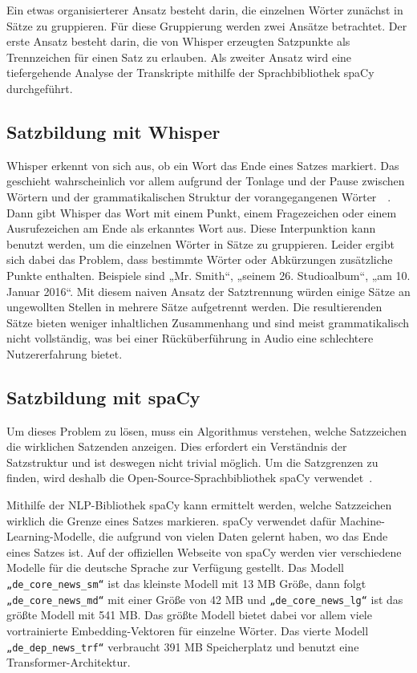 Ein etwas organisierterer Ansatz besteht darin, die einzelnen Wörter zunächst in Sätze zu gruppieren.
Für diese Gruppierung werden zwei Ansätze betrachtet.
Der erste Ansatz besteht darin, die von Whisper erzeugten Satzpunkte als Trennzeichen für einen Satz zu erlauben.
Als zweiter Ansatz wird eine tiefergehende Analyse der Transkripte mithilfe der Sprachbibliothek spaCy durchgeführt.

\subsection{Satzbildung mit Whisper}

Whisper erkennt von sich aus, ob ein Wort das Ende eines Satzes markiert.
Das geschieht wahrscheinlich vor allem aufgrund der Tonlage und der Pause zwischen Wörtern und der grammatikalischen Struktur der vorangegangenen Wörter~\cite{biron2021}~\cite{radford}.
Dann gibt Whisper das Wort mit einem Punkt, einem Fragezeichen oder einem Ausrufezeichen am Ende als erkanntes Wort aus.
Diese Interpunktion kann benutzt werden, um die einzelnen Wörter in Sätze zu gruppieren.
Leider ergibt sich dabei das Problem, dass bestimmte Wörter oder Abkürzungen zusätzliche Punkte enthalten.
Beispiele sind „Mr. Smith“, „seinem 26. Studioalbum“, „am 10. Januar 2016“.
Mit diesem naiven Ansatz der Satztrennung würden einige Sätze an ungewollten Stellen in mehrere Sätze aufgetrennt werden.
Die resultierenden Sätze bieten weniger inhaltlichen Zusammenhang und sind meist grammatikalisch nicht vollständig, was bei einer Rücküberführung in Audio eine schlechtere Nutzererfahrung bietet.

\subsection{Satzbildung mit spaCy}

Um dieses Problem zu lösen, muss ein Algorithmus verstehen, welche Satzzeichen die wirklichen Satzenden anzeigen.
Dies erfordert ein Verständnis der Satzstruktur und ist deswegen nicht trivial möglich.
Um die Satzgrenzen zu finden, wird deshalb die Open-Source-Sprachbibliothek spaCy verwendet~\cite{honnibal2017}.

Mithilfe der NLP-Bibliothek spaCy kann ermittelt werden, welche Satzzeichen wirklich die Grenze eines Satzes markieren.
spaCy verwendet dafür Machine-Learning-Modelle, die aufgrund von vielen Daten gelernt haben, wo das Ende eines Satzes ist.
Auf der offiziellen Webseite von spaCy werden vier verschiedene Modelle für die deutsche Sprache zur Verfügung gestellt.
Das Modell \verb|„de_core_news_sm“| ist das kleinste Modell mit 13 MB Größe, dann folgt \verb|„de_core_news_md“| mit einer Größe von 42 MB und \verb|„de_core_news_lg“| ist das größte Modell mit 541 MB.
Das größte Modell bietet dabei vor allem viele vortrainierte Embedding-Vektoren für einzelne Wörter.
Das vierte Modell \verb|„de_dep_news_trf“| verbraucht 391 MB Speicherplatz und benutzt eine Transformer-Architektur.~\cite{spacy2024}

